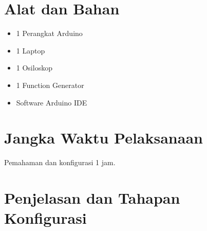 \section{Alat dan Bahan}
\begin{itemize}[label=$\bullet$, itemsep=-1pt, leftmargin=*]
	\item 1 Perangkat Arduino
	\item 1 Laptop
	\item 1 Osiloskop
	\item 1 Function Generator
	\item Software Arduino IDE
\end{itemize}

\section{Jangka Waktu Pelaksanaan}
Pemahaman dan konfigurasi 1 jam.

\section{Penjelasan dan Tahapan Konfigurasi}

